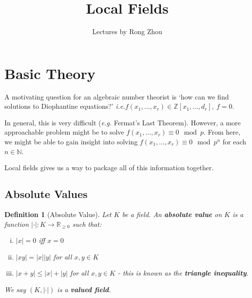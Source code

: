 \documentclass[]{article}
\title{Local Fields}
\author{Lectures by Rong Zhou}
\date{}
\theoremstyle{custhm}
\theoremstyle{cusdef}
\newtheorem{defin}[theorem]{Definition}
\theoremstyle{custhm}
\theoremstyle{custhm}
\theoremstyle{custhm}
\theoremstyle{cusdef}
\theoremstyle{remark}
\newcommand{\N}{\mathbb{N}}
\newcommand{\Z}{\mathbb{Z}}
\newcommand{\R}{\mathbb{R}}
\newcommand{\ra}{\rightarrow}
\newcommand{\ie}{\textit{i.e.}}
\newcommand{\undf}[1]{\textit{\textbf{#1}}}
\renewcommand{\it}[1]{\textit{#1}}
\begin{document}
\maketitle
\clearpage
\tableofcontents
\clearpage

\section{Basic Theory}

A motivating question for an algebraic number theorist is `how can we find solutions to Diophantine equations?' \ie $f(x_1,\dots,x_r)\in \Z[x_1,\dots,d_r],\ f = 0$.

In general, this is very difficult (\it{e.g.} Fermat's Last Theorem). However, a more approachable problem might be to solve $f(x_1,\dots,x_r)\equiv 0 \mod p$. From here, we might be able to gain insight into solving $f(x_1,\dots,x_r)\equiv 0\mod p^n$ for each $n\in\N$.

Local fields gives us a way to package all of this information together.

\subsection{Absolute Values}

\begin{defin}[Absolute Value]
	Let $K$ be a field. An \undf{absolute value} on $K$ is a function $|\cdot|:K\ra\R_{\ge0}$ such that:
	\begin{enumerate}[(i)]
		\item $|x| = 0$ iff $x= 0$
		\item $|xy| = |x||y|$ for all $x,y\in K$
		\item $|x+y| \le |x| + |y|$ for all $x,y\in K$ - this is known as the \undf{triangle inequality}.
	\end{enumerate}

We say $(K,|\cdot|)$ is a \undf{valued field}.
\end{defin}
\end{document}
